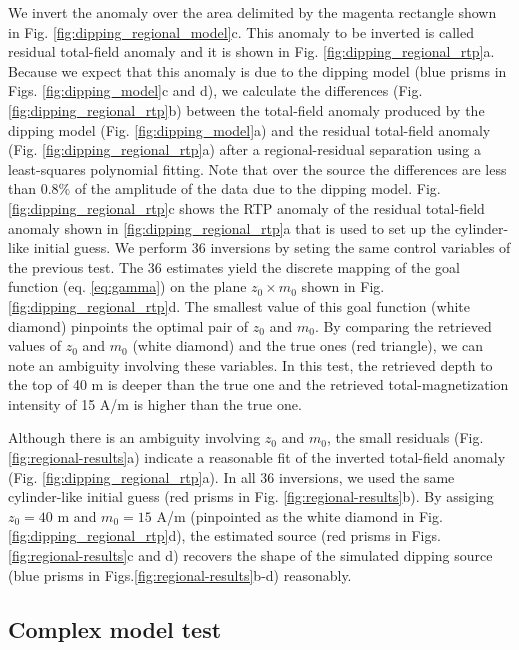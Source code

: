 We invert the anomaly over the area delimited by the magenta rectangle shown in Fig. \ref{fig:dipping_regional_model}c.
This anomaly to be inverted is called residual total-field anomaly and it is shown in 
Fig. \ref{fig:dipping_regional_rtp}a.
Because we expect that this anomaly is due to the dipping model (blue prisms in Figs. \ref{fig:dipping_model}c and d), we calculate the 
differences (Fig. \ref{fig:dipping_regional_rtp}b) between the total-field anomaly produced by the dipping model (Fig.  \ref{fig:dipping_model}a) and the residual total-field anomaly 
(Fig. \ref{fig:dipping_regional_rtp}a) after a regional-residual separation using a least-squares polynomial fitting. 
Note that over the source the differences are less than 0.8$\%$ of the amplitude of the data due to the dipping model.
Fig. \ref{fig:dipping_regional_rtp}c shows the RTP anomaly of the residual total-field anomaly shown in \ref{fig:dipping_regional_rtp}a that is used to set up the 
cylinder-like initial guess.
We perform 36 inversions by seting the same control variables of the previous test.
The 36 estimates yield the discrete mapping of the goal function (eq. \ref{eq:gamma}) 
on the plane $z_0 \times m_0 $ shown in Fig. \ref{fig:dipping_regional_rtp}d.
The smallest value of this goal function (white diamond) pinpoints 
the optimal pair of $z_0$ and $m_0$.
By comparing the retrieved values of $z_0$ and $m_0$ (white diamond)  and
the true ones (red triangle), we can note an ambiguity involving these variables.
In this test, the retrieved depth to the top of 40 m is deeper than the true one and the 
retrieved total-magnetization intensity of 15 A/m is higher than the true one.

Although there is an ambiguity involving $z_0$ and $m_0$, the small residuals (Fig. \ref{fig:regional-results}a) indicate a reasonable fit of the inverted total-field anomaly
(Fig. \ref{fig:dipping_regional_rtp}a).
In all 36 inversions, we used the same cylinder-like initial guess (red prisms in Fig. \ref{fig:regional-results}b).
By assiging $z_0 = 40$ m and $m_0 = 15$ A/m (pinpointed as the white diamond in Fig. \ref{fig:dipping_regional_rtp}d), the estimated source (red prisms in Figs.\ref{fig:regional-results}c and d) recovers the shape of the  simulated dipping source 
(blue prisms in Figs.\ref{fig:regional-results}b-d) reasonably.

\subsection{Complex model test}

